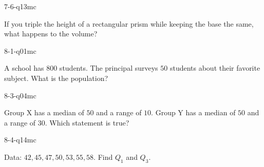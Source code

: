 \begin{practiceQuestion}{7-6-q13}{mc}
\begin{questionText}
If you triple the height of a rectangular prism while keeping the base the same, what happens to the volume?
\end{questionText}
\end{practiceQuestion}

\begin{practiceQuestion}{8-1-q01}{mc}
\begin{questionText}
A school has $800$ students. The principal surveys $50$ students about their favorite subject. What is the population?
\end{questionText}
\end{practiceQuestion}

\begin{practiceQuestion}{8-3-q04}{mc}
\begin{questionText}
Group X has a median of $50$ and a range of $10$. Group Y has a median of $50$ and a range of $30$. Which statement is true?
\end{questionText}
\end{practiceQuestion}

\begin{practiceQuestion}{8-4-q14}{mc}
\begin{questionText}
Data: $42, 45, 47, 50, 53, 55, 58$. Find $Q_1$ and $Q_3$.
\end{questionText}
\end{practiceQuestion}

